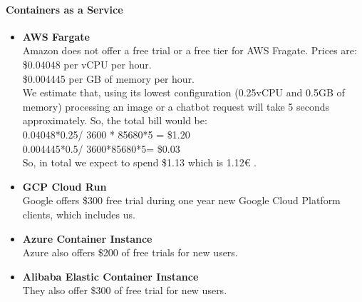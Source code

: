 \documentclass[11pt]{article}
\begin{document}
\paragraph{Containers as a Service}
\begin{itemize}
\item \textbf{AWS Fargate} \\
Amazon does not offer a free trial or a free tier for AWS Fragate.
Prices are:  \\
\$0.04048 per vCPU per hour. \\
\$0.004445 per GB of memory per hour. \\
We estimate that, using its lowest configuration (0.25vCPU and 0.5GB of memory) processing an image or a chatbot request will take 5 seconds approximately. So, the total bill would be: \\
0.04048*0.25/ 3600 * 85680*5 = \$1.20 \\
0.004445*0.5/ 3600*85680*5= \$0.03 \\
So, in total we expect to spend \$1.13 which is 1.12\euro{} .

\item \textbf{GCP Cloud Run} \\
Google offers \$300 free trial during one year new Google Cloud Platform clients, which includes us. 

\item \textbf{Azure Container Instance} \\
Azure also offers \$200 of free trials for new users.

\item \textbf{Alibaba Elastic Container Instance} \\
They also offer \$300 of free trial for new users. 
\end{itemize}
\end{document}
